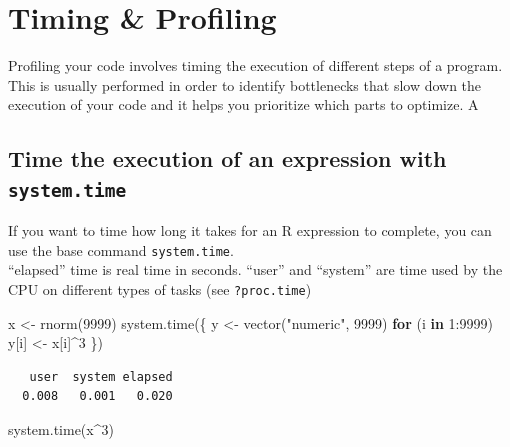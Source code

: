 \documentclass[
]{book}
\newenvironment{Shaded}{\begin{snugshade}}{\end{snugshade}}
\newcommand{\ControlFlowTok}[1]{\textcolor[rgb]{0.13,0.29,0.53}{\textbf{#1}}}
\newcommand{\DecValTok}[1]{\textcolor[rgb]{0.00,0.00,0.81}{#1}}
\newcommand{\FunctionTok}[1]{\textcolor[rgb]{0.00,0.00,0.00}{#1}}
\newcommand{\NormalTok}[1]{#1}
\newcommand{\OtherTok}[1]{\textcolor[rgb]{0.56,0.35,0.01}{#1}}
\newcommand{\SpecialCharTok}[1]{\textcolor[rgb]{0.00,0.00,0.00}{#1}}
\newcommand{\StringTok}[1]{\textcolor[rgb]{0.31,0.60,0.02}{#1}}
\begin{document}
\hypertarget{profiling}{%
\chapter{Timing \& Profiling}\label{profiling}}

Profiling your code involves timing the execution of different steps of a program. This is usually performed in order to identify bottlenecks that slow down the execution of your code and it helps you prioritize which parts to optimize. A

\hypertarget{time-the-execution-of-an-expression-with-system.time}{%
\section{\texorpdfstring{Time the execution of an expression with \texttt{system.time}}{Time the execution of an expression with system.time}}\label{time-the-execution-of-an-expression-with-system.time}}

If you want to time how long it takes for an R expression to complete, you can use the base command \texttt{system.time}.\\
``elapsed'' time is real time in seconds. ``user'' and ``system'' are time used by the CPU on different types of tasks (see \texttt{?proc.time})

\begin{Shaded}
\begin{Highlighting}[]
\NormalTok{x }\OtherTok{\textless{}{-}} \FunctionTok{rnorm}\NormalTok{(}\DecValTok{9999}\NormalTok{)}
\FunctionTok{system.time}\NormalTok{(\{}
\NormalTok{    y }\OtherTok{\textless{}{-}} \FunctionTok{vector}\NormalTok{(}\StringTok{"numeric"}\NormalTok{, }\DecValTok{9999}\NormalTok{)}
    \ControlFlowTok{for}\NormalTok{ (i }\ControlFlowTok{in} \DecValTok{1}\SpecialCharTok{:}\DecValTok{9999}\NormalTok{) y[i] }\OtherTok{\textless{}{-}}\NormalTok{ x[i]}\SpecialCharTok{\^{}}\DecValTok{3}
\NormalTok{\})}
\end{Highlighting}
\end{Shaded}

\begin{verbatim}
   user  system elapsed 
  0.008   0.001   0.020 
\end{verbatim}

\begin{Shaded}
\begin{Highlighting}[]
\FunctionTok{system.time}\NormalTok{(x}\SpecialCharTok{\^{}}\DecValTok{3}\NormalTok{)}
\end{Highlighting}
\end{Shaded}
\end{document}
